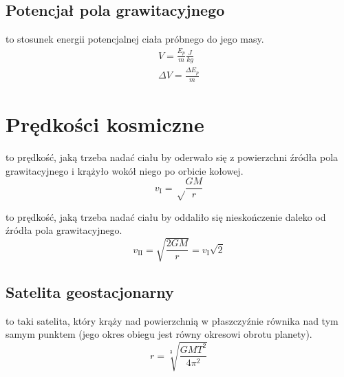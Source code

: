 \subsection{Potencjał pola grawitacyjnego}
\begin{definition}
   to stosunek energii potencjalnej ciała próbnego do jego masy.
  \begin{subequations}
    \begin{gather}
      V = \frac{E_p}{m} \unit{\frac{J}{kg}}\\
      \Delta V = \frac{\Delta E_p}{m}
    \end{gather}
  \end{subequations}
\end{definition}

\section{Prędkości kosmiczne}

\begin{definition}
   to prędkość, jaką trzeba nadać ciału by oderwało się z
  powierzchni źródła pola grawitacyjnego i krążyło wokół niego po orbicie kołowej.
  \begin{equation*}
    v_{\scriptscriptstyle\mathrm I} = \sqrt\frac{GM}{r}
  \end{equation*}
\end{definition}

\begin{definition}
   to prędkość, jaką trzeba nadać ciału by oddaliło się nieskończenie
  daleko od źródła pola grawitacyjnego.
  \begin{equation*}
    v_{\scriptscriptstyle \mathrm{II}} = \sqrt{\frac{2GM}{r}} = v_{\scriptscriptstyle\mathrm I} \sqrt 2
  \end{equation*}
\end{definition}

\subsection{Satelita geostacjonarny}
\begin{definition}
   to taki satelita, który krąży nad powierzchnią w płaszczyźnie
  równika nad tym samym punktem (jego okres obiegu jest równy okresowi obrotu planety).
  \begin{equation*}
    r = \sqrt[3]{\frac{GMT^2}{4\pi^2}}
  \end{equation*}
\end{definition}

